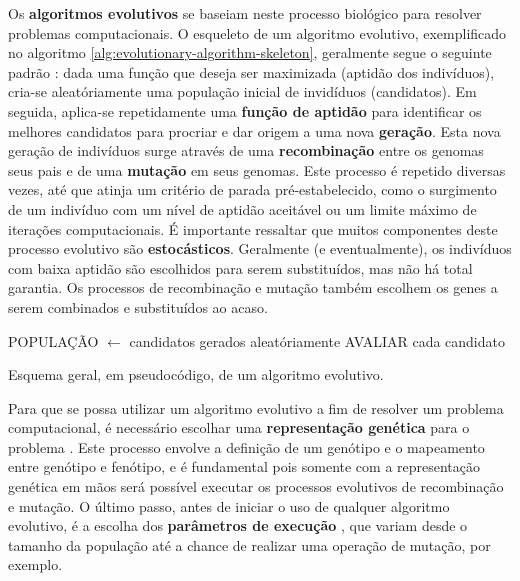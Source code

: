 Os \textbf{algoritmos evolutivos} se baseiam neste processo biológico para
resolver problemas computacionais. O esqueleto de um algoritmo evolutivo,
exemplificado no algoritmo \ref{alg:evolutionary-algorithm-skeleton}, geralmente
segue o seguinte padrão \cite[Cap. 3]{IntroEvolComputing}: dada uma função que
deseja ser maximizada (aptidão dos indivíduos), cria-se aleatóriamente uma
população inicial de invidíduos (candidatos). Em seguida, aplica-se
repetidamente uma \textbf{função de aptidão} para identificar os melhores
candidatos para procriar e dar origem a uma nova \textbf{geração}. Esta nova
geração de indivíduos surge através de uma \textbf{recombinação} entre os
genomas seus pais e de uma \textbf{mutação} em seus genomas.  Este processo é
repetido diversas vezes, até que atinja um critério de parada pré-estabelecido,
como o surgimento de um indivíduo com um nível de aptidão aceitável ou um limite
máximo de iterações computacionais. É importante ressaltar que muitos
componentes deste processo evolutivo são \textbf{estocásticos}.  Geralmente (e
eventualmente), os indivíduos com baixa aptidão são escolhidos para serem
substituídos, mas não há total garantia. Os processos de recombinação e mutação
também escolhem os genes a serem combinados e substituídos ao acaso.

\begin{algorithm}[h]
\begin{center}
	\begin{algorithmic}[1]
        \STATE POPULAÇÃO $\gets$ candidatos gerados aleatóriamente
		\STATE AVALIAR cada candidato
		\REPEAT
    \end{algorithmic}
\end{center}
\caption[Esquema geral, em pseudocódigo, de um algoritmo evolutivo.]
{\label{alg:evolutionary-algorithm-skeleton} Esquema geral, em pseudocódigo, de
um algoritmo evolutivo.}
\end{algorithm}

Para que se possa utilizar um algoritmo evolutivo a fim de resolver um problema
computacional, é necessário escolhar uma \textbf{representação genética} para o
problema \cite[Cap. 4]{IntroEvolComputing}. Este processo envolve a definição de
um genótipo e o mapeamento entre genótipo e fenótipo, e é fundamental pois
somente com a representação genética em mãos será possível executar os processos
evolutivos de recombinação e mutação. O último passo, antes de iniciar o uso de
qualquer algoritmo evolutivo, é a escolha dos \textbf{parâmetros de execução}
\cite[Cap.  7]{IntroEvolComputing}, que variam desde o tamanho da população até
a chance de realizar uma operação de mutação, por exemplo.

